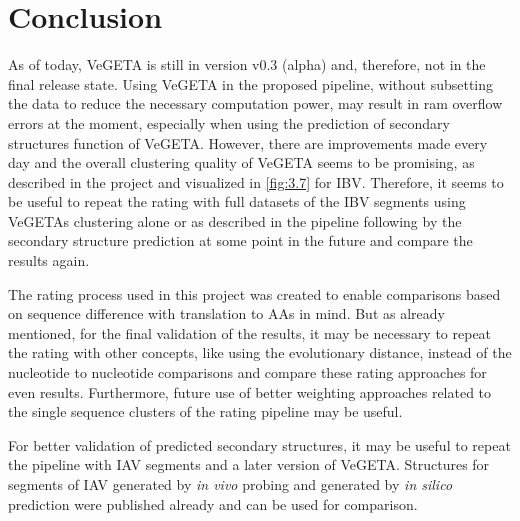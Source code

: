 \chapter{Conclusion} \label{chap:4}
    
    As of today, VeGETA is still in version v0.3 (alpha) and, therefore, not in the final release state. Using VeGETA in the proposed pipeline, without subsetting the data to reduce the necessary computation power, may result in ram overflow errors at the moment, especially when using the prediction of secondary structures function of VeGETA. However, there are improvements made every day and the overall clustering quality of VeGETA seems to be promising, as described in the project and visualized in \autoref{fig:3.7} for \gls{IBV}. Therefore, it seems to be useful to repeat the rating with full datasets of the \gls{IBV} segments using VeGETAs clustering alone or as described in the pipeline following by the secondary structure prediction at some point in the future and compare the results again. %
    
    The rating process used in this project was created to enable comparisons based on sequence difference with translation to \glspl{AA} in mind. But as already mentioned, for the final validation of the results, it may be necessary to repeat the rating with other concepts, like using the evolutionary distance, instead of the nucleotide to nucleotide comparisons and compare these rating approaches for even results. Furthermore, future use of better weighting approaches related to the single sequence clusters of the rating pipeline may be useful. 

    For better validation of predicted secondary structures, it may be useful to repeat the pipeline with \gls{IAV} segments and a later version of VeGETA. Structures for segments of \gls{IAV} generated by \textit{in vivo} probing \autocite{probing} and generated by \textit{in silico} prediction were published already \autocite{A_structure1, A_structure2, A_structure3} and can be used for comparison.
    
